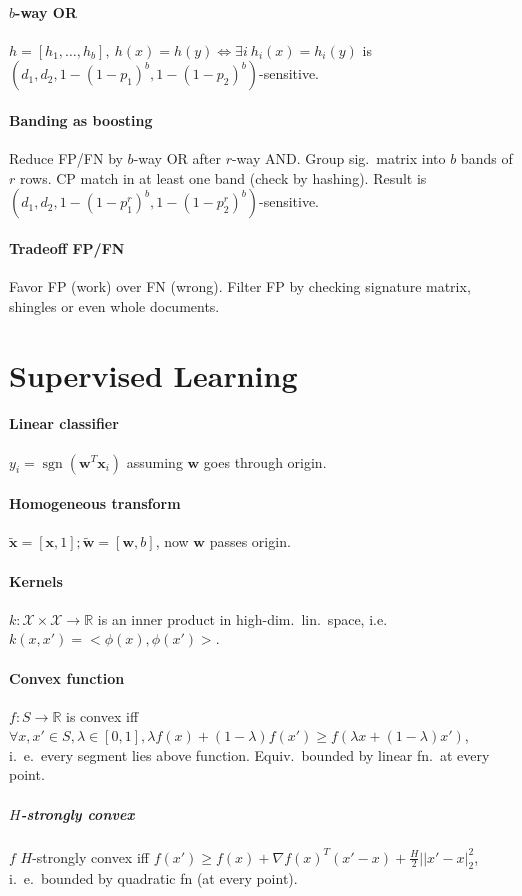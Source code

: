 \documentclass[9pt]{scrartcl}
\DeclareMathOperator{\sign}{sgn}
\newcommand{\R}{\mathbb{R}}
\begin{document}
\begin{twocolumn}
\paragraph{$b$-way OR}
$h = [h_1,\dots,h_b],\ h(x) = h(y) \Leftrightarrow \exists i\ h_i(x) = h_i(y)$ is $(d_1,d_2,1-(1-p_1)^b,1-(1-p_2)^b)$-sensitive.

\paragraph{Banding as boosting}
Reduce FP/FN by $b$-way OR after $r$-way AND.
Group sig.\ matrix into $b$ bands of $r$ rows.
CP match in at least one band (check by hashing).
Result is $(d_1,d_2,1-(1-p_1^r)^b,1-(1-p_2^r)^b)$-sensitive.

\paragraph{Tradeoff FP/FN}
Favor FP (work) over FN (wrong).
Filter FP by checking signature matrix, shingles or even whole documents.


\section{Supervised Learning}
\paragraph{Linear classifier} $y_i = \sign(\bm w^T\bm x_i)$ assuming $\bm w$ goes through origin.
\paragraph{Homogeneous transform} $\tilde{\bm x} = [\bm x, 1]; \tilde{\bm w} = [\bm w, b]$, now $\bm w$ passes origin.
\paragraph{Kernels}
$k: \mathcal{X}\times\mathcal{X} \rightarrow \R$ is an inner product in high-dim.\ lin.\ space, i.e.\ $k(x,x') = <\phi(x),\phi(x')>$.

\paragraph{Convex function} $f: S \rightarrow \R$ is convex iff $\forall x,x'\in S, \lambda \in [0,1], \lambda f(x) + (1-\lambda)f(x') \geq f(\lambda x + (1-\lambda)x')$, i.\ e.\ every segment lies above function. Equiv.\ bounded by linear fn.\ at every point.
\subparagraph{$H$-strongly convex} $f$ $H$-strongly convex iff $f(x') \geq f(x) + \nabla f(x)^T(x'-x)+\frac{H}{2}||x'-x|_2^2$, i.\ e.\ bounded by quadratic fn (at every point).

\end{twocolumn}
\end{document}
